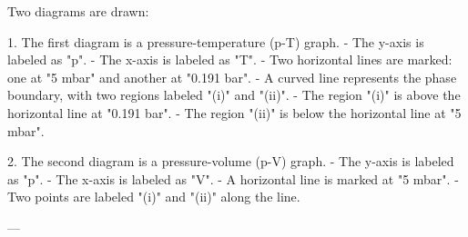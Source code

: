 Two diagrams are drawn:  

1. The first diagram is a pressure-temperature (p-T) graph.  
   - The y-axis is labeled as "p".  
   - The x-axis is labeled as "T".  
   - Two horizontal lines are marked: one at "5 mbar" and another at "0.191 bar".  
   - A curved line represents the phase boundary, with two regions labeled "(i)" and "(ii)".  
   - The region "(i)" is above the horizontal line at "0.191 bar".  
   - The region "(ii)" is below the horizontal line at "5 mbar".  

2. The second diagram is a pressure-volume (p-V) graph.  
   - The y-axis is labeled as "p".  
   - The x-axis is labeled as "V".  
   - A horizontal line is marked at "5 mbar".  
   - Two points are labeled "(i)" and "(ii)" along the line.  

---
